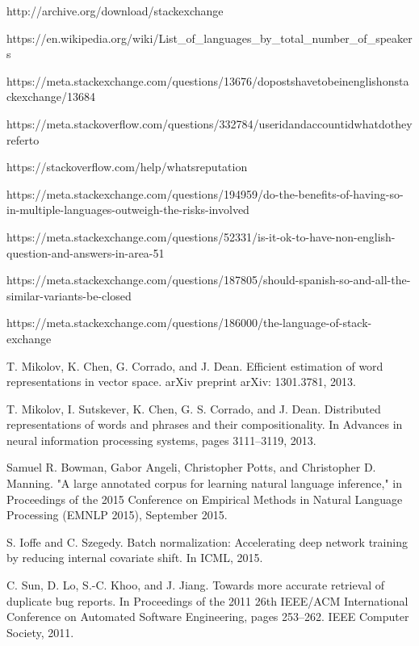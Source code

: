 
\begin{thebibliography}{1}

http://archive.org/download/stackexchange

 https://en.wikipedia.org/wiki/List\_of\_languages\_by\_total\_number\_of\_speakers
 
 https://meta.stackexchange.com/questions/13676/do\-posts\-have\-to\-be\-in\-english\-on\-stack\-exchange/13684

 https://meta.stackoverflow.com/questions/332784/user\-id\-and\-account\-id\-what\-do\-they\-refer\-to
 
https://stackoverflow.com/help/whats\-reputation 

https://meta.stackexchange.com/questions/194959/do-the-benefits-of-having-so-in-multiple-languages-outweigh-the-risks-involved

https://meta.stackexchange.com/questions/52331/is-it-ok-to-have-non-english-question-and-answers-in-area-51

https://meta.stackexchange.com/questions/187805/should-spanish-so-and-all-the-similar-variants-be-closed

https://meta.stackexchange.com/questions/186000/the-language-of-stack-exchange

 T. Mikolov, K. Chen, G. Corrado, and J. Dean. Efficient estimation of word representations in vector space. arXiv preprint arXiv: 1301.3781, 2013. 
 
 T. Mikolov, I. Sutskever, K. Chen, G. S. Corrado, and J. Dean. Distributed representations of words and phrases and their compositionality. In Advances in neural information processing systems, pages 3111–3119, 2013.

Samuel R. Bowman, Gabor Angeli, Christopher Potts, and Christopher D. Manning. "A large annotated corpus for learning natural language inference," in Proceedings of the 2015 Conference on Empirical Methods in Natural Language Processing (EMNLP 2015), September 2015.

S. Ioffe and C. Szegedy. Batch normalization: Accelerating deep network training by reducing internal covariate shift. In ICML, 2015.
   
C. Sun, D. Lo, S.-C. Khoo, and J. Jiang. Towards more accurate retrieval of duplicate bug reports. In Proceedings of the 2011 26th IEEE/ACM International Conference on Automated Software Engineering, pages 253–262. IEEE Computer Society, 2011.


\end{thebibliography}
